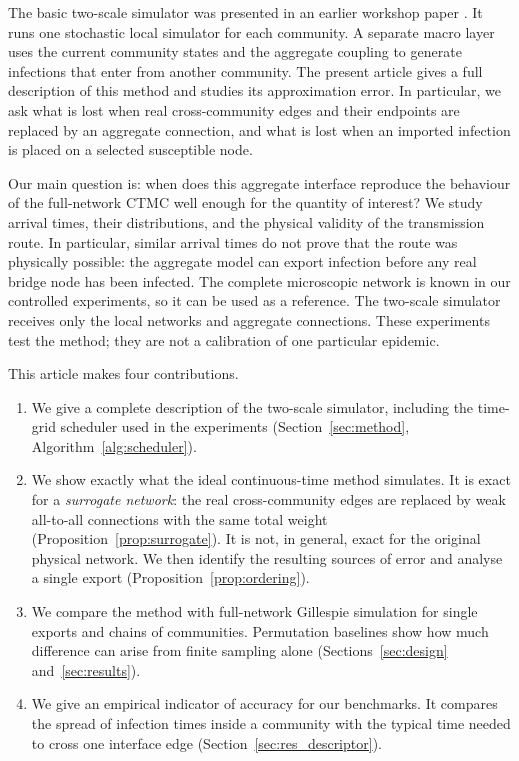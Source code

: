 \documentclass[a4paper,fleqn]{cas-sc}
\begin{document}
The basic two-scale simulator was presented in an earlier workshop paper \citep{kuryliak2025towards}. It runs one stochastic local simulator for each community. A separate macro layer uses the current community states and the aggregate coupling to generate infections that enter from another community. The present article gives a full description of this method and studies its approximation error. In particular, we ask what is lost when real cross-community edges and their endpoints are replaced by an aggregate connection, and what is lost when an imported infection is placed on a selected susceptible node.

Our main question is: when does this aggregate interface reproduce the behaviour of the full-network CTMC well enough for the quantity of interest? We study arrival times, their distributions, and the physical validity of the transmission route. In particular, similar arrival times do not prove that the route was physically possible: the aggregate model can export infection before any real bridge node has been infected. The complete microscopic network is known in our controlled experiments, so it can be used as a reference. The two-scale simulator receives only the local networks and aggregate connections. These experiments test the method; they are not a calibration of one particular epidemic.

This article makes four contributions.
\begin{enumerate}
\item We give a complete description of the two-scale simulator, including the time-grid scheduler used in the experiments (Section~\ref{sec:method}, Algorithm~\ref{alg:scheduler}).
\item We show exactly what the ideal continuous-time method simulates. It is exact for a \emph{surrogate network}: the real cross-community edges are replaced by weak all-to-all connections with the same total weight (Proposition~\ref{prop:surrogate}). It is not, in general, exact for the original physical network. We then identify the resulting sources of error and analyse a single export (Proposition~\ref{prop:ordering}).
\item We compare the method with full-network Gillespie simulation for single exports and chains of communities. Permutation baselines show how much difference can arise from finite sampling alone (Sections~\ref{sec:design} and~\ref{sec:results}).
\item We give an empirical indicator of accuracy for our benchmarks. It compares the spread of infection times inside a community with the typical time needed to cross one interface edge (Section~\ref{sec:res_descriptor}).
\end{enumerate}
\end{document}
